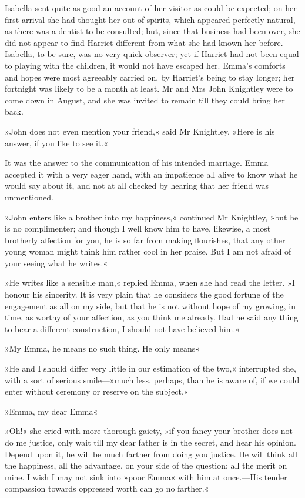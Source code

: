 Isabella sent quite as good an account of her visitor as could be expected; on her first arrival she had thought her out of spirits, which appeared perfectly natural, as there was a dentist to be consulted; but, since that business had been over, she did not appear to find Harriet different from what she had known her before.—Isabella, to be sure, was no very quick observer; yet if Harriet had not been equal to playing with the children, it would not have escaped her. Emma's comforts and hopes were most agreeably carried on, by Harriet's being to stay longer; her fortnight was likely to be a month at least. Mr and Mrs John Knightley were to come down in August, and she was invited to remain till they could bring her back.

»John does not even mention your friend,« said Mr Knightley. »Here is his answer, if you like to see it.«

It was the answer to the communication of his intended marriage. Emma accepted it with a very eager hand, with an impatience all alive to know what he would say about it, and not at all checked by hearing that her friend was unmentioned.

»John enters like a brother into my happiness,« continued Mr Knightley, »but he is no complimenter; and though I well know him to have, likewise, a most brotherly affection for you, he is so far from making flourishes, that any other young woman might think him rather cool in her praise. But I am not afraid of your seeing what he writes.«

»He writes like a sensible man,« replied Emma, when she had read the letter. »I honour his sincerity. It is very plain that he considers the good fortune of the engagement as all on my side, but that he is not without hope of my growing, in time, as worthy of your affection, as you think me already. Had he said any thing to bear a different construction, I should not have believed him.«

»My Emma, he means no such thing. He only means\longdash«

»He and I should differ very little in our estimation of the two,« interrupted she, with a sort of serious smile—»much less, perhaps, than he is aware of, if we could enter without ceremony or reserve on the subject.«

»Emma, my dear Emma\longdash«

»Oh!« she cried with more thorough gaiety, »if you fancy your brother does not do me justice, only wait till my dear father is in the secret, and hear his opinion. Depend upon it, he will be much farther from doing you justice. He will think all the happiness, all the advantage, on your side of the question; all the merit on mine. I wish I may not sink into »poor Emma« with him at once.—His tender compassion towards oppressed worth can go no farther.«

